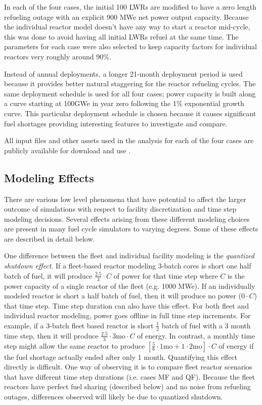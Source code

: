 \documentclass{style}
\begin{document}
In each of the four cases, the initial 100 LWRs are modified to have a zero
length refueling outage with an explicit 900 MWe net power output capacity.  Because the
individual reactor model doesn't have any way to start a reactor mid-cycle,
this was done to avoid having all initial LWRs refuel at the same time.  The
parameters for each case were also selected to keep capacity factors for
individual reactors very roughly around 90\%.

Instead of annual deployments, a longer 21-month deployment period is used
because it provides better natural staggering for the reactor refueling
cycles. The same deployment schedule is used for all four cases; power
capacity is built along a curve starting at 100GWe in year zero following the
1\% exponential growth curve.  This particular deployment schedule is chosen
because it causes significant fuel shortages providing interesting features to
investigate and compare.

All input files and other assets used in the analysis for each of the four
cases are publicly available for download and use \cite{Carlsen2015}.

\subsection{Modeling Effects}

There are various low level phenomena that have potential to affect the larger
outcome of simulations with respect to facility discretization and time step
modeling decisions. Several effects arising from these different modeling
choices are present in many fuel cycle simulators to varying degrees.  Some of
these effects are described in detail below.

One difference between the fleet and individual facility modeling is the
\emph{quantized shutdown effect}.  If a fleet-based reactor modeling 3-batch
cores is short one half batch of fuel, it will produce $\frac{2.5}{3}\cdot C$
of power for that time step where $C$ is the power capacity of a single
reactor of the fleet (e.g. 1000 MWe).  If an individually modeled reactor is
short a half batch of fuel, then it will produce no power ($0 \cdot C$) that
time step.  Time step duration can also have this effect.  For both fleet and
individual reactor modeling, power goes offline in full time step increments.
For example, if a 3-batch fleet based reactor is short $\frac{1}{2}$ batch of
fuel with a 3 month time step, then it will produce $\frac{2.5}{3} \cdot 3
\text{mo} \cdot C $ of energy.  In contrast, a monthly time step might allow
the same reactor to produce $[\frac{5}{6} \cdot 1 \text{mo} + 1 \cdot 2
\text{mo}] \cdot C $ of energy if the fuel shortage actually ended after only
1 month.  Quantifying this effect directly is difficult.  One way of observing
it is to compare fleet reactor scenarios that have different time step
durations (i.e. cases MF and QF).  Because the fleet reactors have perfect fuel
sharing (described below) and no noise from refueling outages, differences observed will
likely be due to quantized shutdown.
\end{document}
